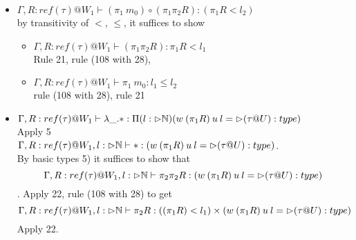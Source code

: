 \documentclass{article}
\begin{document}
\begin{itemize}
\begin{itemize}
    \item $\Gamma, R: ref(\tau) @ W_1 \vdash (\pi_1\: m_0) \circ (\pi_1 \pi_2 R) : (\pi_1 R < l_2)$\\
    by transitivity of $<$, $\leq$, it suffices to show
    \begin{itemize}
        \item $\Gamma, R: ref(\tau) @ W_1 \vdash (\pi_1 \pi_2 R): \pi_1 R < l_1$\\
        Rule 21, rule (108 with 28), 
        \item $\Gamma, R: ref(\tau) @ W_1 \vdash \pi_1\: m_0: l_1 \leq l_2$\\
        rule (108 with 28), rule 21
    \end{itemize}
    \item $\Gamma, R: ref(\tau) @ W_1 \vdash \lambda \_. * : \Pi(l: \rhd \mathbb{N})(w \: (\pi_1 R) \: u \: l = \rhd (\tau @ U) : type)$\\
    Apply 5\\
     $\Gamma, R: ref(\tau) @ W_1, l : \rhd \mathbb{N} \vdash  * :(w \: (\pi_1 R) \: u \: l = \rhd (\tau @ U) : type)$.\\
     By basic types 5) it suffices to show that 
     \[\Gamma, R: ref(\tau) @ W_1, l : \rhd \mathbb{N} \vdash  \pi_2 \pi_2 R :(w \: (\pi_1 R) \: u \: l = \rhd (\tau @ U) : type)\]. 
     Apply 22, rule (108 with 28) to get
     \[\Gamma, R: ref(\tau) @ W_1, l : \rhd \mathbb{N} \vdash \pi_2 R :((\pi_1 R) < l_1) \times (w \: (\pi_1 R) \: u \: l = \rhd (\tau @ U) : type)\]
     Apply 22.

\end{itemize}
\end{itemize}
\end{document}
